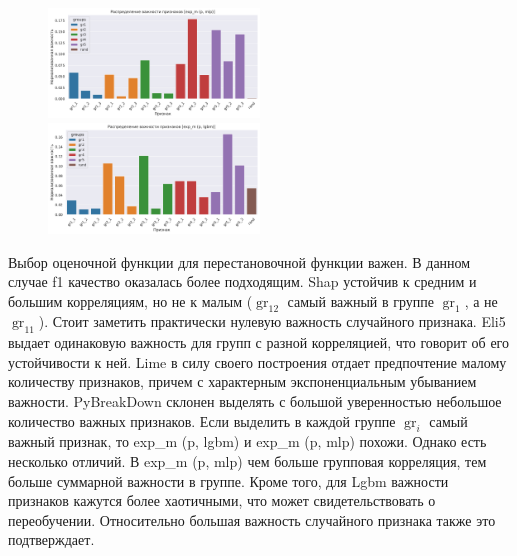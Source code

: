 \documentclass[12pt]{article}
\begin{document}
\begin{figure}[h]
        \includegraphics[width=0.5\textwidth]{images/TargetSum_allFeatures_exp_m (p, mlp).pdf}
        \includegraphics[width=0.5\textwidth]{images/TargetSum_allFeatures_exp_m (p, lgbm).pdf}
\end{figure}

Выбор оценочной функции для перестановочной функции важен. В данном случае f1 качество оказалась более подходящим. Shap устойчив к средним и большим корреляциям, но не к малым ($\operatorname{gr}_{12}$ самый важный в группе $\operatorname{gr}_{1}$, а не $\operatorname{gr}_{11}$). Стоит заметить практически нулевую важность случайного признака. Eli5 выдает одинаковую важность для групп с разной корреляцией, что говорит об его устойчивости к ней. Lime в силу своего построения отдает предпочтение малому количеству признаков, причем с характерным экспоненциальным убыванием важности. PyBreakDown склонен выделять с большой уверенностью небольшое количество важных признаков. Если выделить в каждой группе $\operatorname{gr}_i$ самый важный признак, то exp\_m (p, lgbm) и exp\_m (p, mlp) похожи. Однако есть несколько отличий. В exp\_m (p, mlp) чем больше групповая корреляция, тем больше суммарной важности в группе. Кроме того, для Lgbm важности признаков кажутся более хаотичными, что может свидетельствовать о переобучении. Относительно большая важность случайного признака также это подтверждает.


\newpage
\end{document}
